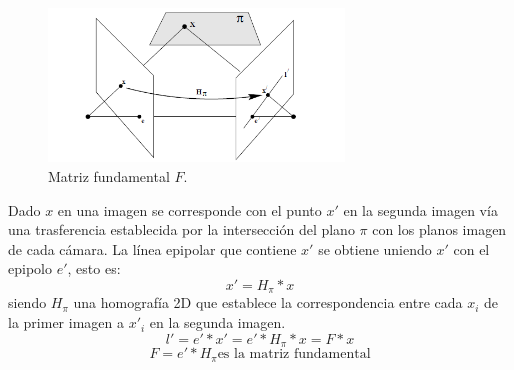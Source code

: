 \begin{figure}[H]
  \centering
    \includegraphics[width=0.7\textwidth]{./Cap2_videomapping/epipolar2.PNG}
  \caption[Multiple View Geometry in Computer Vision, Fig. 9.5]{Matriz fundamental $F$.}
  \label{fig:Epipolar2}
\end{figure}
Dado $x$ en una imagen se corresponde con el punto $x'$ en la segunda imagen vía una trasferencia establecida por la intersección del plano $\pi$ con los planos imagen de cada cámara.
La línea epipolar que contiene $x'$ se obtiene uniendo $x'$ con el epipolo $e'$, esto es:
\[ x' = H_{\pi} * x \]    siendo  $H_{\pi}$ una homografía 2D que establece la correspondencia entre cada $x_i$ de la primer imagen a $x'_i$ en la segunda imagen.
\[ l' = e' * x' = e' * H_{\pi} * x = F * x  \]
\[ F = e' * H_{\pi}  \mbox{es la matriz fundamental}  \]